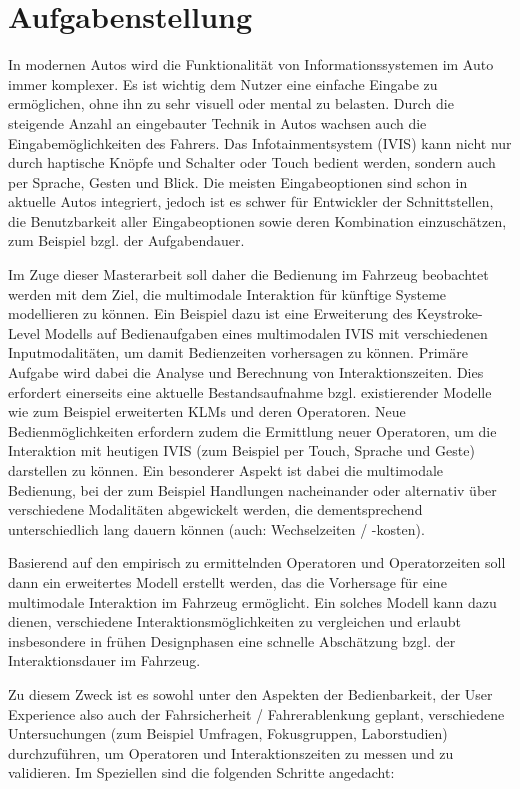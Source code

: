 \documentclass[11pt,a4paper,twoside]{book}
\begin{document}
\chapter*{Aufgabenstellung}
In modernen Autos wird die Funktionalität von Informationssystemen im Auto immer komplexer. Es ist wichtig dem Nutzer eine einfache Eingabe zu ermöglichen, ohne ihn zu sehr visuell oder mental zu belasten. Durch die steigende Anzahl an eingebauter Technik in Autos wachsen auch die Eingabemöglichkeiten des Fahrers. Das Infotainmentsystem (IVIS) kann nicht nur durch haptische Knöpfe und Schalter oder Touch bedient werden, sondern auch per Sprache, Gesten und Blick. Die meisten Eingabeoptionen sind schon in aktuelle Autos integriert, jedoch ist es schwer für Entwickler der Schnittstellen, die Benutzbarkeit aller Eingabeoptionen sowie deren Kombination einzuschätzen, zum Beispiel bzgl. der Aufgabendauer.

Im Zuge dieser Masterarbeit soll daher die Bedienung im Fahrzeug beobachtet werden mit dem Ziel, die multimodale Interaktion für künftige Systeme modellieren zu können. Ein Beispiel dazu ist eine Erweiterung des Keystroke-Level Modells auf Bedienaufgaben eines multimodalen IVIS mit verschiedenen Inputmodalitäten, um damit Bedienzeiten vorhersagen zu können. Primäre Aufgabe wird dabei die Analyse und Berechnung von Interaktionszeiten. Dies erfordert einerseits eine aktuelle Bestandsaufnahme bzgl. existierender Modelle wie zum Beispiel erweiterten KLMs und deren Operatoren. Neue Bedienmöglichkeiten erfordern zudem die Ermittlung neuer Operatoren, um die Interaktion mit heutigen IVIS (zum Beispiel per Touch, Sprache und Geste) darstellen zu können. Ein besonderer Aspekt ist dabei die multimodale Bedienung, bei der zum Beispiel Handlungen nacheinander oder alternativ über verschiedene Modalitäten abgewickelt werden, die dementsprechend unterschiedlich lang dauern können (auch: Wechselzeiten / -kosten).

Basierend auf den empirisch zu ermittelnden Operatoren und Operatorzeiten soll dann ein erweitertes Modell erstellt werden, das die Vorhersage für eine multimodale Interaktion im Fahrzeug ermöglicht. Ein solches Modell kann dazu dienen, verschiedene Interaktionsmöglichkeiten zu vergleichen und erlaubt insbesondere in frühen Designphasen eine schnelle Abschätzung bzgl. der Interaktionsdauer im Fahrzeug.

Zu diesem Zweck ist es sowohl unter den Aspekten der Bedienbarkeit, der User Experience also auch der Fahrsicherheit / Fahrerablenkung geplant, verschiedene Untersuchungen (zum Beispiel Umfragen, Fokusgruppen, Laborstudien) durchzuführen, um Operatoren und Interaktionszeiten zu messen und zu validieren. Im Speziellen sind die folgenden Schritte angedacht:
\end{document}
